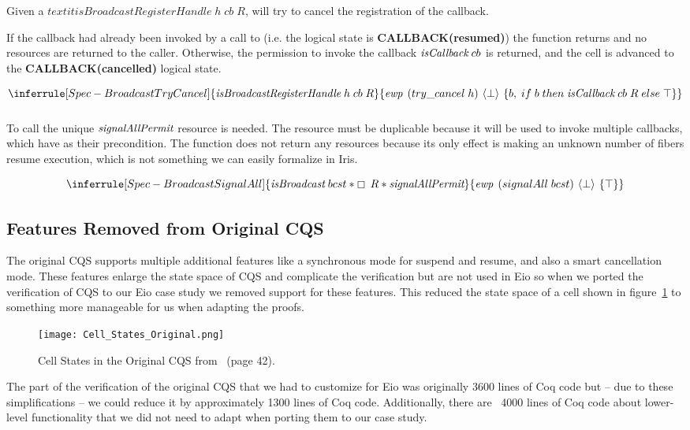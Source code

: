 Given a \(textit{isBroadcastRegisterHandle}\; h\; cb\; R\),  will try to cancel the registration of the callback.

If the callback had already been invoked by a call to  (i.e. the logical state is \textbf{CALLBACK(resumed)}) the function returns  and no resources are returned to the caller.
Otherwise, the permission to invoke the callback \(\emph{isCallback}{}\; cb\) is returned, and the cell is advanced to the \textbf{CALLBACK(cancelled)} logical state.

\[
  \inferrule[Spec-BroadcastTryCancel]
  { \emph{isBroadcastRegisterHandle}\; h\; cb\; R }
  { \ewp{try\_cancel\; h}{\bot}{b,\; if\; b\; then\; \gsIsCb{}\; cb\; R\; else\; \top}}
\]

\subsubsection{}
\label{sec:broadcast-spec-signal-all}

To call  the unique \(\emph{signalAllPermit}{}\) resource is needed.
The  resource must be duplicable because it will be used to invoke multiple callbacks, which have  as their precondition.
The function does not return any resources because its only effect is making an unknown number of fibers resume execution, which is not something we can easily formalize in Iris.

\[
  \inferrule[Spec-BroadcastSignalAll]
  { \gsIsBcst{}\; bcst \ast \always{}\;R \ast \gssignal{}}
  { \ewp{signalAll\; bcst}{\bot}{\top} }
\]

\subsection{Features Removed from Original CQS}
\label{sec:broadcast-spec-removed-features}

The original CQS supports multiple additional features like a synchronous mode for suspend and resume, and also a smart cancellation mode.
These features enlarge the state space of CQS and complicate the verification but are not used in Eio so when we ported the verification of CQS to our Eio case study we removed support for these features.
This reduced the state space of a cell shown in figure~\ref{fig:cqs-cell-states-original} to something more manageable for us when adapting the proofs.

\begin{figure}[ht]
  \texttt{[image: Cell\_States\_Original.png]}
  \caption{Cell States in the Original CQS from~\cite{koval2023cqs} (page 42).}
  \label{fig:cqs-cell-states-original}
\end{figure}

The part of the verification of the original CQS that we had to customize for Eio was originally 3600 lines of Coq code but -- due to these simplifications -- we could reduce it by approximately 1300 lines of Coq code.
Additionally, there are ~4000 lines of Coq code about lower-level functionality that we did not need to adapt when porting them to our case study.
